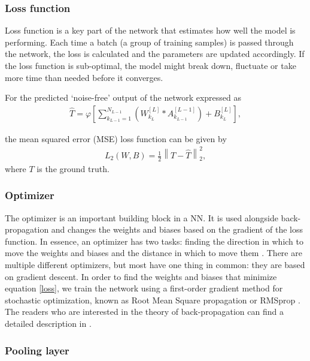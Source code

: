 \documentclass[a4paper]{article}
\begin{document}
\subsubsection{Loss function}

Loss function is a key part of the network that estimates how well the model is performing. Each time a batch (a group of training samples) is passed through the network, the loss is calculated and the parameters are updated accordingly. If the loss function is sub-optimal, the model might break down, fluctuate or take more time than needed before it converges. 

For the predicted ‘noise-free’ output of the network expressed as
\begin{align}
    \hat{T}=
    \varphi\left[\sum_{k_{L-1}=1}^{N_{L-1}} (W_{k_{L}}^{[L]} \ast A_{k_{L-1}}^{[L-1]})
    + B_{k_{L}}^{[L]} \right],
\end{align}

the mean squared error (MSE) loss function can be given by
\begin{align}
    L_{2}(W,B)=\frac{1}{2}\left \| T-\hat{T} \right\|_{2}^{2},
    \label{loss}
\end{align}
where $T$ is the ground truth.

\subsubsection{Optimizer}

The optimizer is an important building block in a NN. It is used alongside back-propagation and changes the weights and biases based on the gradient of the loss function. In essence, an optimizer has two tasks: finding the direction in which to move the weights and biases and the distance in which to move them \cite{Mitchell1997}. There are multiple different optimizers, but most have one thing in common: they are based on gradient descent. In order to find the weights and biases that minimize equation \ref{loss}, we train the network using a first-order gradient method for stochastic optimization, known as Root Mean Square propagation or RMSprop \cite{rmsprop}. The readers who are interested in the theory of back-propagation can find a detailed description in \cite{project2}.

\subsubsection{Pooling layer}
\end{document}

